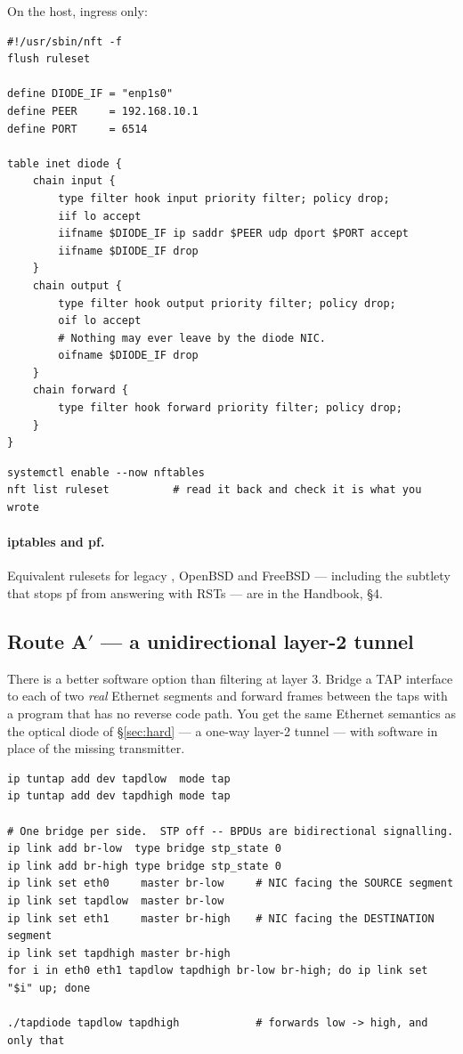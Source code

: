 \documentclass[11pt,a4paper]{article}
\begin{document}
On the \dstside{} host, ingress only:

\begin{lstlisting}[style=nft,caption={\file{/etc/nftables.conf} --- DESTINATION host}]
#!/usr/sbin/nft -f
flush ruleset

define DIODE_IF = "enp1s0"
define PEER     = 192.168.10.1
define PORT     = 6514

table inet diode {
    chain input {
        type filter hook input priority filter; policy drop;
        iif lo accept
        iifname $DIODE_IF ip saddr $PEER udp dport $PORT accept
        iifname $DIODE_IF drop
    }
    chain output {
        type filter hook output priority filter; policy drop;
        oif lo accept
        # Nothing may ever leave by the diode NIC.
        oifname $DIODE_IF drop
    }
    chain forward {
        type filter hook forward priority filter; policy drop;
    }
}
\end{lstlisting}

\begin{lstlisting}[style=shell]
systemctl enable --now nftables
nft list ruleset          # read it back and check it is what you wrote
\end{lstlisting}

\paragraph{iptables and pf.} Equivalent rulesets for legacy ,
OpenBSD  and FreeBSD  --- including the
 subtlety that stops pf from answering with RSTs
--- are in the Handbook, \S4.

\subsection{Route A$'$ --- a unidirectional layer-2 tunnel}
\label{sec:tap}

There is a better software option than filtering at layer 3. Bridge a TAP
interface to each of two \emph{real} Ethernet segments and forward frames
between the taps with a program that has no reverse code path. You get the
same Ethernet semantics as the optical diode of \S\ref{sec:hard} --- a
one-way layer-2 tunnel --- with software in place of the missing transmitter.

\begin{lstlisting}[style=shell,caption={On the forwarding host}]
ip tuntap add dev tapdlow  mode tap
ip tuntap add dev tapdhigh mode tap

# One bridge per side.  STP off -- BPDUs are bidirectional signalling.
ip link add br-low  type bridge stp_state 0
ip link add br-high type bridge stp_state 0
ip link set eth0     master br-low     # NIC facing the SOURCE segment
ip link set tapdlow  master br-low
ip link set eth1     master br-high    # NIC facing the DESTINATION segment
ip link set tapdhigh master br-high
for i in eth0 eth1 tapdlow tapdhigh br-low br-high; do ip link set "$i" up; done

./tapdiode tapdlow tapdhigh            # forwards low -> high, and only that
\end{lstlisting}
\end{document}

